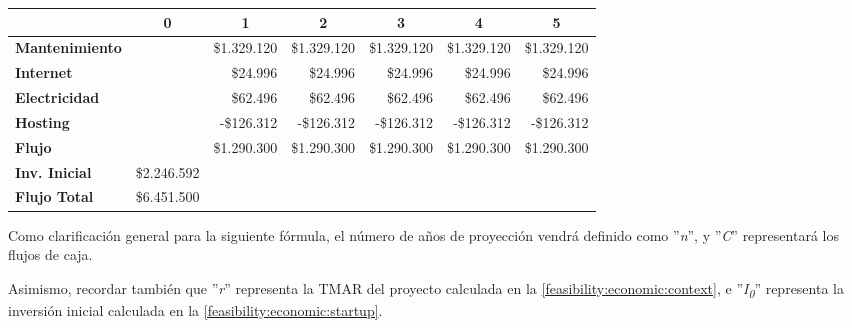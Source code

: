\begin{center}
	\begin{tabular}{ | l | l | l | l | l | l | l |}
		\hline
		& \multicolumn{1}{|c|}{\textbf{0}} & \multicolumn{1}{|c|}{\textbf{1}} & \multicolumn{1}{|c|}{\textbf{2}} & \multicolumn{1}{|c|}{\textbf{3}} & \multicolumn{1}{|c|}{\textbf{4}} & \multicolumn{1}{|c|}{\textbf{5}} \\
		\hline
		{\textbf{Mantenimiento}} &  & \multicolumn{1}{|r|}{\$1.329.120} & \multicolumn{1}{|r|}{\$1.329.120} & \multicolumn{1}{|r|}{\$1.329.120} & \multicolumn{1}{|r|}{\$1.329.120} & \multicolumn{1}{|r|}{\$1.329.120} \\ \hline
		
		{\textbf{Internet}} &  & \multicolumn{1}{|r|}{\$24.996} & \multicolumn{1}{|r|}{\$24.996} & \multicolumn{1}{|r|}{\$24.996} & \multicolumn{1}{|r|}{\$24.996} & \multicolumn{1}{|r|}{\$24.996} \\ \hline
		
		{\textbf{Electricidad}} &  & \multicolumn{1}{|r|}{\$62.496} & \multicolumn{1}{|r|}{\$62.496} & \multicolumn{1}{|r|}{\$62.496} & \multicolumn{1}{|r|}{\$62.496} & \multicolumn{1}{|r|}{\$62.496} \\ \hline
		
		{\textbf{Hosting}} &  & \multicolumn{1}{|r|}{-\$126.312} & \multicolumn{1}{|r|}{-\$126.312} & \multicolumn{1}{|r|}{-\$126.312} & \multicolumn{1}{|r|}{-\$126.312} & \multicolumn{1}{|r|}{-\$126.312} \\ \hline
		
		{\textbf{Flujo}} &  & \multicolumn{1}{|r|}{\$1.290.300} & \multicolumn{1}{|r|}{\$1.290.300} & \multicolumn{1}{|r|}{\$1.290.300} & \multicolumn{1}{|r|}{\$1.290.300} & \multicolumn{1}{|r|}{\$1.290.300} \\ \hline
		{\textbf{Inv. Inicial}} & \multicolumn{1}{|r|}{\$2.246.592} & & & & & \\ \hline
		\textbf{Flujo Total} & \multicolumn{1}{|r|}{\$6.451.500} & & & & & \\ \hline
	\end{tabular}

  \label{table:van}
\end{center}

Como clarificación general para la siguiente fórmula, el número de años de proyección vendrá definido como ''\textit{n}'', y ''\textit{C}'' representará los flujos de caja.

Asimismo, recordar también que ''\textit{r}'' representa la TMAR del proyecto calculada en la \autoref{feasibility:economic:context}, e ''\textit{I\textsubscript{0}}'' representa la inversión inicial calculada en la \autoref{feasibility:economic:startup}.

